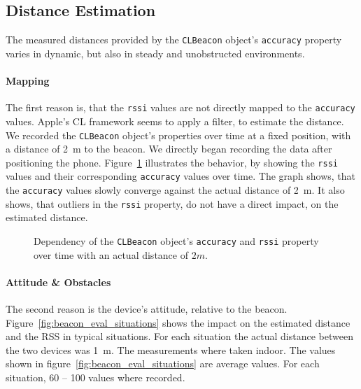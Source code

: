 \subsection{Distance Estimation}

The measured distances provided by the \texttt{CLBeacon} object's \texttt{accuracy} property varies in dynamic, but also in steady and unobstructed environments.

\paragraph{Mapping} The first reason is, that the \texttt{rssi} values are not directly mapped to the \texttt{accuracy} values. Apple's \ac{CL} framework seems to apply a filter, to estimate the distance. We recorded the \texttt{CLBeacon} object's properties over time at a fixed position, with a distance of 2~m to the beacon. We directly began recording the data after positioning the phone. Figure~\ref{fig:beacon_eval_accuracy-rssi} illustrates the behavior, by showing the \texttt{rssi} values and their corresponding \texttt{accuracy} values over time. The graph shows, that the \texttt{accuracy} values slowly converge against the actual distance of 2~m. It also shows, that outliers in the \texttt{rssi} property, do not have a direct impact, on the estimated distance.

\begin{figure}
	
	\caption {Dependency of the \texttt{CLBeacon} object's \texttt{accuracy} and \texttt{rssi} property over time with an actual distance of $2m$.}
	\label{fig:beacon_eval_accuracy-rssi}
\end{figure}

\paragraph{Attitude \& Obstacles} The second reason is the device's attitude, relative to the beacon. Figure~\ref{fig:beacon_eval_situations} shows the impact on the estimated distance and the \acs{RSS} in typical situations.
For each situation the actual distance between the two devices was 1~m. The measurements where taken indoor. The values shown in figure~\ref{fig:beacon_eval_situations} are average values. For each situation, 60 -- 100 values where recorded.\newline

